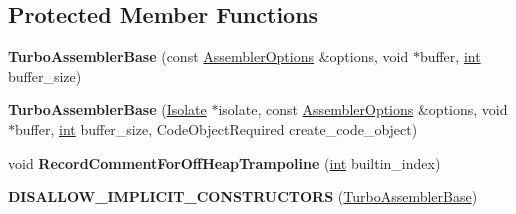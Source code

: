 \subsection*{Protected Member Functions}
\begin{DoxyCompactItemize}
\item 
\mbox{\label{classv8_1_1internal_1_1TurboAssemblerBase_ab904c4d201c353d07f3fc04a66015302}} 
{\bfseries Turbo\+Assembler\+Base} (const \mbox{\hyperlink{structv8_1_1internal_1_1AssemblerOptions}{Assembler\+Options}} \&options, void $\ast$buffer, \mbox{\hyperlink{classint}{int}} buffer\+\_\+size)
\item 
\mbox{\label{classv8_1_1internal_1_1TurboAssemblerBase_a80c6ca576cc822d38a5c1fdf34bb52c5}} 
{\bfseries Turbo\+Assembler\+Base} (\mbox{\hyperlink{classv8_1_1internal_1_1Isolate}{Isolate}} $\ast$isolate, const \mbox{\hyperlink{structv8_1_1internal_1_1AssemblerOptions}{Assembler\+Options}} \&options, void $\ast$buffer, \mbox{\hyperlink{classint}{int}} buffer\+\_\+size, Code\+Object\+Required create\+\_\+code\+\_\+object)
\item 
\mbox{\label{classv8_1_1internal_1_1TurboAssemblerBase_a1ee06df1dbc8ce3885d7fc29b00f18f3}} 
void {\bfseries Record\+Comment\+For\+Off\+Heap\+Trampoline} (\mbox{\hyperlink{classint}{int}} builtin\+\_\+index)
\item 
\mbox{\label{classv8_1_1internal_1_1TurboAssemblerBase_ac907c68724041a12b81045dba993dfa2}} 
{\bfseries D\+I\+S\+A\+L\+L\+O\+W\+\_\+\+I\+M\+P\+L\+I\+C\+I\+T\+\_\+\+C\+O\+N\+S\+T\+R\+U\+C\+T\+O\+RS} (\mbox{\hyperlink{classv8_1_1internal_1_1TurboAssemblerBase}{Turbo\+Assembler\+Base}})
\end{DoxyCompactItemize}
